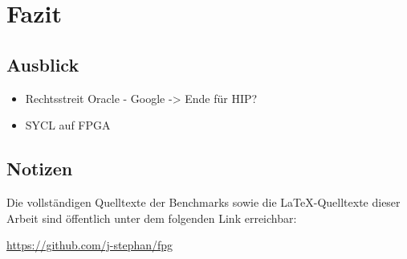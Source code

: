 \section{Fazit}
\label{fazit}

\subsection{Ausblick}
\label{fazit:ausblick}

\begin{itemize}
    \item Rechtsstreit Oracle - Google -> Ende für HIP?
    \item SYCL auf FPGA
\end{itemize}

\subsection{Notizen}

Die vollständigen Quelltexte der Benchmarks sowie die \LaTeX-Quelltexte dieser
Arbeit sind öffentlich unter dem folgenden Link erreichbar:

\url{https://github.com/j-stephan/fpg}
